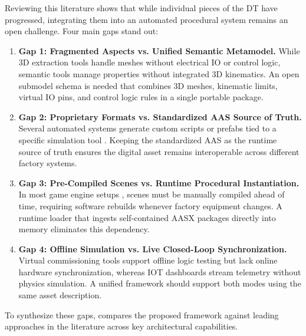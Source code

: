 Reviewing this literature shows that while individual pieces of the \gls{DT} have progressed, integrating them into an automated procedural system remains an open challenge. Four main gaps stand out:

\begin{enumerate}
    \item \textbf{Gap 1: Fragmented Aspects vs. Unified Semantic Metamodel.}
    While 3D extraction tools \cite{Chowdhury2025,Dong2024} handle meshes without electrical \gls{IO} or control logic, semantic tools \cite{Gollner2022,Perez2025} manage properties without integrated 3D kinematics. An open submodel schema is needed that combines 3D meshes, kinematic limits, virtual \gls{IO} pins, and control logic rules in a single portable package.
    
    \item \textbf{Gap 2: Proprietary Formats vs. Standardized AAS Source of Truth.}
    Several automated systems generate custom scripts or prefabs tied to a specific simulation tool \cite{Alexopoulos2025,Schaper2025,Koch2024}. Keeping the standardized \gls{AAS} as the runtime source of truth ensures the digital asset remains interoperable across different factory systems.
    
    \item \textbf{Gap 3: Pre-Compiled Scenes vs. Runtime Procedural Instantiation.}
    In most game engine setups \cite{Alexopoulos2025,Pajpach2022,Garcia2025}, scenes must be manually compiled ahead of time, requiring software rebuilds whenever factory equipment changes. A runtime loader that ingests self-contained \gls{AASX} packages directly into memory eliminates this dependency.
    
    \item \textbf{Gap 4: Offline Simulation vs. Live Closed-Loop Synchronization.}
    Virtual commissioning tools \cite{Striffler2023,Schaper2025} support offline logic testing but lack online hardware synchronization, whereas \gls{IOT} dashboards stream telemetry without physics simulation. A unified framework should support both modes using the same asset description.
\end{enumerate}

To synthesize these gaps,  compares the proposed framework against leading approaches in the literature across key architectural capabilities.


